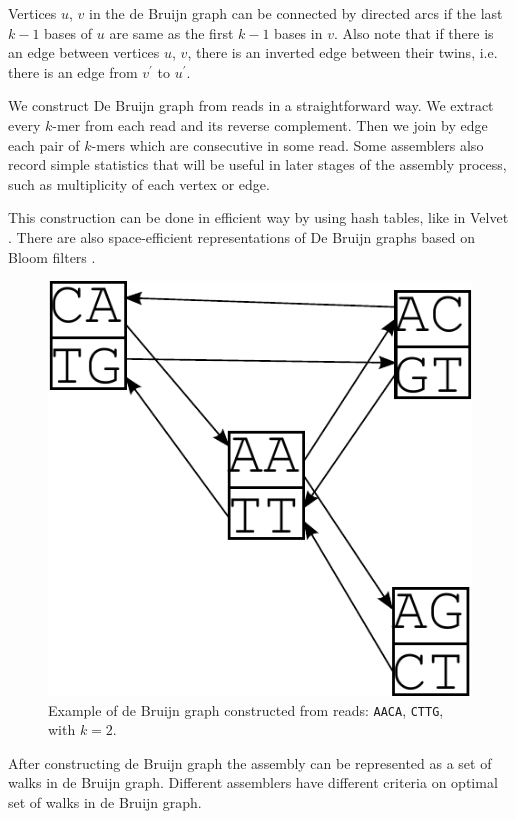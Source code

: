 Vertices $u$, $v$ in the de Bruijn graph can be connected by directed arcs if the last
$k-1$ bases of $u$ are same as the first $k-1$ bases in $v$. Also note that
if there is an edge between vertices $u$, $v$, there is an inverted edge between their twins,
i.e. there is an edge from $v^{'}$ to $u^{'}$.

We construct De Bruijn graph from reads in a straightforward way.
We extract every $k$-mer from each read and its reverse complement.
Then we join by edge each pair of $k$-mers which are consecutive in some read.
Some assemblers also record simple statistics that will be useful in later
stages of the assembly process, such as multiplicity of each vertex or edge.

This construction can be done in efficient way by using hash tables, like in Velvet \citep{Velvet}.
There are also space-efficient representations of De Bruijn graphs based on Bloom filters \citep{minia}.

\begin{figure}
  \centerline{\includegraphics[scale=0.5]{../figures/db.pdf}}
  \caption{Example of de Bruijn graph constructed from reads: \texttt{AACA}, \texttt{CTTG}, with $k=2$.}
\end{figure}

After constructing de Bruijn graph the assembly can be represented
as a set of walks in de Bruijn graph. Different assemblers
have different criteria on optimal set of walks in de Bruijn graph. 

